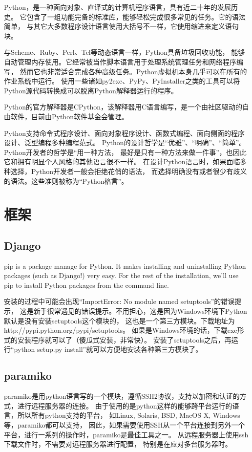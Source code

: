 \documentclass{book}
\begin{document}
Python，是一种面向对象、直译式的计算机程序语言，具有近二十年的发展历史。
它包含了一组功能完备的标准库，能够轻松完成很多常见的任务。它的语法简单，
与其它大多数程序设计语言使用大括号不一样，它使用缩进来定义语句块。

与Scheme、Ruby、Perl、Tcl等动态语言一样，Python具备垃圾回收功能，
能够自动管理内存使用。它经常被当作脚本语言用于处理系统管理任务和网络程序编写，
然而它也非常适合完成各种高级任务。Python虚拟机本身几乎可以在所有的作业系统中运行。
使用一些诸如py2exe、PyPy、PyInstaller之类的工具可以将Python源代码转换成可以脱离Python解释器运行的程序。

Python的官方解释器是CPython，该解释器用C语言编写，是一个由社区驱动的自由软件，目前由Python软件基金会管理。

Python支持命令式程序设计、面向对象程序设计、函数式编程、面向侧面的程序设计、泛型编程多种编程范式。
Python的设计哲学是“优雅”、“明确”、“简单”。Python开发者的哲学是“用一种方法，
最好是只有一种方法来做一件事”，也因此它和拥有明显个人风格的其他语言很不一样。
在设计Python语言时，如果面临多种选择，Python开发者一般会拒绝花俏的语法，
而选择明确没有或者很少有歧义的语法。这些准则被称为“Python格言”。

\section{框架}

\subsection{Django}

pip is a package manage for Python. 
It makes installing and uninstalling Python packages (such as Django!) very easy. 
For the rest of the installation, we’ll use pip to install Python packages from the command line.

安装的过程中可能会出现“ImportError: No module named setuptools”的错误提示，
这是新手很常遇见的错误提示。不用担心，这是因为Windows环境下Python默认是没有安装setuptools这个模块的，
这也是一个第三方模块。下载地址为http://pypi.python.org/pypi/setuptools。
如果是Windows环境的话，下载exe形式的安装程序就可以了（傻瓜式安装，非常快）。
安装了setuptools之后，再运行“python setup.py install”就可以方便地安装各种第三方模块了。

\subsection{paramiko}

paramiko是用python语言写的一个模块，遵循SSH2协议，支持以加密和认证的方式，进行远程服务器的连接。
由于使用的是python这样的能够跨平台运行的语言，所以所有python支持的平台，
如Linux, Solaris, BSD, MacOS X, Windows等，paramiko都可以支持，
因此，如果需要使用SSH从一个平台连接到另外一个平台，进行一系列的操作时，paramiko是最佳工具之一。
从远程服务器上使用ssh下载文件时，不需要对远程服务器进行配置，
特别是在应对多台服务器时。
\end{document}
